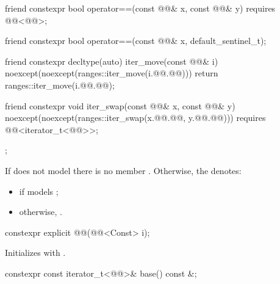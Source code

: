 \begin{codeblock}
{{    friend constexpr bool operator==(const @@& x, const @@& y)
      requires @@<@@>;

    friend constexpr bool operator==(const @@& x, default_sentinel_t);

    friend constexpr decltype(auto) iter_move(const @@& i)
    noexcept(noexcept(ranges::iter_move(i.@@.@@))) {
      return ranges::iter_move(i.@@.@@);
    }

    friend constexpr void iter_swap(const @@& x, const @@& y)
      noexcept(noexcept(ranges::iter_swap(x.@@.@@, y.@@.@@)))
      requires @@<iterator_t<@@>>;
  };
}
\end{codeblock}

\pnum
If  does not model 
there is no member .
Otherwise, the   denotes:
\begin{itemize}
\item
{} if
 models \linebreak
{};
\item otherwise, .
\end{itemize}

%
\begin{itemdecl}
constexpr explicit @@(@@<Const> i);
\end{itemdecl}

\begin{itemdescr}
\pnum
\effects
Initializes  with .
\end{itemdescr}

%
\begin{itemdecl}
constexpr const iterator_t<@@>& base() const &;
\end{itemdecl}

